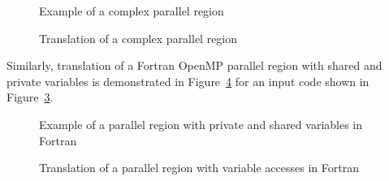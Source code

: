 \lstset{language=C,basicstyle=\scriptsize}
\begin{figure}[htbp]
{\indent
  {\mySmallFontSize
    \begin{latexonly}
    
    \end{latexonly}
    \begin{htmlonly}
    
    \end{htmlonly}
  }
}
\caption{Example of a complex parallel region}
\label{Manual:omp:preduction}
\end{figure}

\begin{figure}[htbp]
{\indent
  {\mySmallFontSize
    \begin{latexonly}
    
    \end{latexonly}
    \begin{htmlonly}
    
    \end{htmlonly}
  }
}
\caption{Translation of a complex parallel region}
\label{Manual:omp:preduction-trans}
\end{figure}

Similarly, translation of a Fortran OpenMP parallel region with shared and private variables
is demonstrated in
Figure~\ref{Manual:omp:shared-trans-f} for an input code shown in
Figure~\ref{Manual:omp:shared-f}.

\lstset{language=Fortran,basicstyle=\scriptsize}
\lstset{language=Fortran,basicstyle=\scriptsize,numbers=left}
\begin{figure}[htbp]
{\indent
  {\mySmallFontSize
    \begin{latexonly}
    
    \end{latexonly}
    \begin{htmlonly}
    
    \end{htmlonly}
  }
}
\caption{Example of a parallel region with private and shared variables in Fortran}
\label{Manual:omp:shared-f}
\end{figure}

\begin{figure}[htbp]
{\indent
  {\mySmallFontSize
    \begin{latexonly}
    
    \end{latexonly}
    \begin{htmlonly}
    
    \end{htmlonly}
  }
}
\caption{Translation of a parallel region with variable accesses in Fortran}
\label{Manual:omp:shared-trans-f}
\end{figure}



